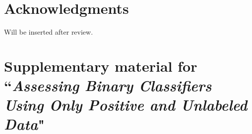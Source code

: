 \documentclass{article} %
\begin{document}
\section*{Acknowledgments} 
Will be inserted after review.
\newpage



\newpage
\section*{Supplementary material for ``\emph{Assessing Binary Classifiers Using Only Positive and Unlabeled Data}"}
\appendix


\end{document}
